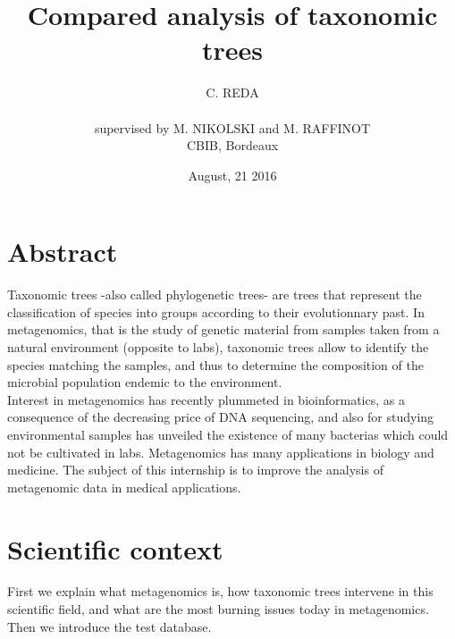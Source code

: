 \documentclass{report}
\title{Compared analysis of taxonomic trees}
\author{C. REDA \\ \\ supervised by M. NIKOLSKI and M. RAFFINOT\\CBIB, Bordeaux}
\date{August, 21 2016}
\begin{document}
\maketitle
{}

\chapter*{Abstract}
\nocite{*}
Taxonomic trees -also called phylogenetic trees- are trees that represent the classification of species into groups according to their evolutionnary past. In metagenomics, that is the study of genetic material from samples taken from a natural environment (opposite to labs), taxonomic trees allow to identify the species matching the samples, and thus to determine the composition of the microbial population endemic to the environment.\\

Interest in metagenomics has recently plummeted in bioinformatics, as a consequence of the decreasing price of DNA sequencing, and also for studying environmental samples has unveiled the existence of many bacterias which could not be cultivated in labs. Metagenomics has many applications in biology and medicine. The subject of this internship is to improve the analysis of metagenomic data in medical applications.\\

\newpage
 
\tableofcontents
 
\newpage

\listoffigures

\newpage

\listoftables

\newpage
 

\xpatchcmd{\chapter}{%
  \thispagestyle{plain}%
}{%
  \pagestyle{mystyle}
}{}{}

\chapter{Scientific context}

First we explain what metagenomics is, how taxonomic trees intervene in this scientific field, and what are the most burning issues today in metagenomics. Then we introduce the test database.
\end{document}
